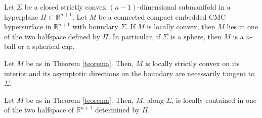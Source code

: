 \documentclass[10pt,a4paper]{amsart}
\begin{document}
\begin{theorem}
	\label{teorema}
	Let $\Sigma$ be a closed strictly convex  $(n-1)$-dimensional submanifold in a hyperplane $\Pi\subset \mathbb{R}^{n+1}$. Let $M$ be a connected compact embedded CMC hypersurface in $\mathbb{R}^{n+1}$ with boundary $\Sigma$. If $M$ is locally convex, then $M$ lies in one of the two halfspace defined by $\Pi$. In particular, if $\Sigma$ is a sphere, then $M$ is a $n$-ball or a spherical cap.
\end{theorem}

\begin{proposition}
	\label{lema}
	Let $M$ be as in Theorem \ref{teorema}.  Then, $M$ is locally strictly convex on its interior and its asymptotic directions on the boundary are necessarily tangent to $\Sigma$. 
\end{proposition}

\begin{proposition}
	\label{lema2}
	Let $M$ be as in Theorem \ref{teorema}.  Then, $M$, along $\Sigma$, is locally contained in one of the two halfspace of $\mathbb{R}^{n+1}$ determined by $\Pi.$ 
	\end{proposition}
\end{document}
